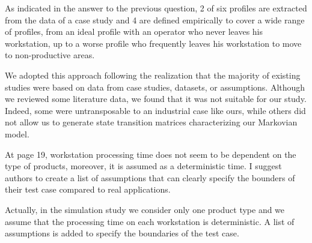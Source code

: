 \documentclass[preprint,11pt,3p]{elsarticle}
\begin{document}
\begin{tcolorbox}[colback=r_color1,colframe=r_color2,title=Response to Q14 :]
    As indicated in the answer to the previous question, 2 of six profiles are extracted from the data of a case study and 4 are defined empirically to cover a wide range of profiles, from an ideal profile with an operator who never leaves his workstation, up to a worse profile who frequently leaves his workstation to move to non-productive areas.
    
    We adopted this approach following the realization that the majority of existing studies were based on data from case studies, datasets, or assumptions. Although we reviewed some literature data, we found that it was not suitable for our study. Indeed, some were untransposable to an industrial case like ours, while others did not allow us to generate state transition matrices characterizing our Markovian model.		
\end{tcolorbox}

\begin{tcolorbox}[colback=q_color1,colframe=q_color2,title=Q15 :]	
    At page 19, workstation processing time does not seem to be dependent on the type of products, moreover, it is assumed as a deterministic time. I suggest authors to create a list of assumptions that can clearly specify the bounders of their test case compared to real applications.
\end{tcolorbox}
\begin{tcolorbox}[colback=r_color1,colframe=r_color2,title=Response to Q15  :]
    Actually, in the simulation study we consider only one product type and we assume that the processing time on each workstation is deterministic.
    A list of assumptions is added to specify the boundaries of the test case. 
\end{tcolorbox}
\end{document}
